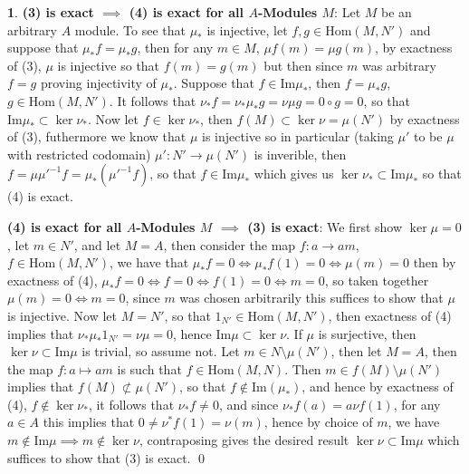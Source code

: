 \documentclass[11pt]{article}
\theoremstyle{definition}
\newtheorem{pb}{}
\newcommand{\ho}{\text{Hom}}
\begin{document}
\begin{pb}
        \textbf{(3) is exact \(\mathbf{\implies}\) (4) is exact for all \(A\)-Modules \(M\)}: Let \(M\) be an arbitrary \(A\) module.
        To see that \(\mu_*\) is injective, let \(f,g \in \ho(M,N')\) and suppose that \(\mu_*f = \mu_*g\), then for any \(m \in M\), \(\mu f(m) = \mu g(m)\), by exactness of (3), \(\mu\) is injective so that \(f(m) = g(m)\) but then since \(m\) was arbitrary \(f = g\) proving injectivity of \(\mu_*\). Suppose that \(f \in \text{Im}\mu_*\), then \(f = \mu_*g\), \(g \in \ho(M,N')\). It follows that \(\nu_*f = \nu_* \mu_* g = \nu\mu g = 0 \circ g = 0\), so that \(\text{Im}\mu_* \subset \ker \nu_*\). Now let \(f \in \ker \nu_*\), then \(f(M) \subset \ker \nu = \mu(N')\) by exactness of (3), futhermore we know that \(\mu\) is injective so in particular (taking \(\mu'\) to be \(\mu\) with restricted codomain) \(\mu': N' \to \mu(N')\) is inverible, then \(f = \mu \mu'^{-1}f = \mu_*(\mu'^{-1}f)\), so that \(f \in \text{Im}\mu_*\) which gives us \(\ker \nu_* \subset \text{Im}\mu_*\) so that (4) is exact.

        \textbf{(4) is exact for all \(A\)-Modules \(M\) \(\mathbf{\implies}\) (3) is exact}:
        We first show \(\ker \mu = 0\), let \(m \in N'\), and let \(M = A\), then consider the map \(f:a \to am\), \(f \in \ho(M,N')\), we have that \(\mu_*f = 0 \iff \mu_*f(1) = 0 \iff \mu(m) = 0\) then by exactness of (4), \(\mu_*f = 0 \iff f = 0 \iff f(1) = 0 \iff m = 0\), so taken together \(\mu(m) = 0 \iff m = 0\), since \(m\) was chosen arbitrarily this suffices to show that \(\mu\) is injective. Now let \(M = N'\), so that \(1_{N'} \in \ho(M,N')\), then exactness of (4) implies that \(\nu_*\mu_*1_{N'} = \nu\mu = 0\), hence \(\text{Im}\mu \subset \ker \nu\). If \(\mu\) is surjective, then \(\ker \nu \subset \text{Im} \mu\) is trivial, so assume not. Let \(m \in N \setminus \mu(N')\), then let \(M = A\), then the map \(f: a \mapsto am\) is such that \(f \in \ho(M,N)\). Then \(m \in f(M) \setminus \mu(N')\) implies that \(f(M) \not \subset \mu(N')\), so that \(f \not \in \text{Im}(\mu_*)\), and hence by exactness of (4), \(f \not \in \ker \nu_*\), it follows that \(\nu_*f \neq 0\), and since \(\nu_*f(a) = a\nu f(1)\), for any \(a \in A\) this implies that \(0 \neq \nu^*f(1) = \nu(m)\), hence by choice of \(m\), we have \(m \not \in \text{Im} \mu \implies m \not \in \ker \nu\), contraposing gives the desired result \(\ker \nu \subset \text{Im}\mu\) which suffices to show that (3) is exact. \qed
    \end{pb}
\end{document}
